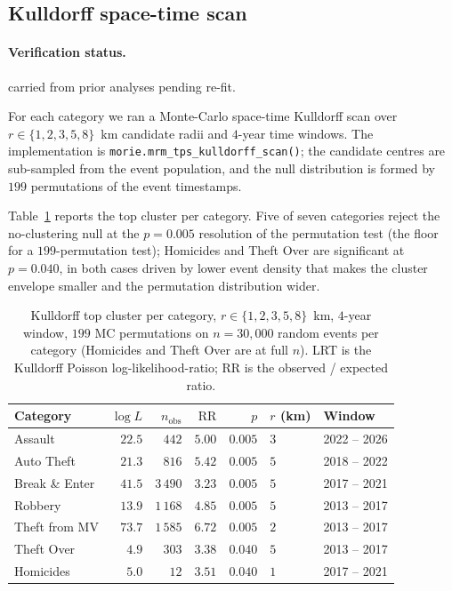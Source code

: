 \documentclass[article,shortnames,nojss]{jss}
\begin{document}
\subsection{Kulldorff space-time scan}\label{phys-kulldorff}


\paragraph*{Verification status.}
carried from prior analyses pending re-fit.

For each category we ran a Monte-Carlo space-time Kulldorff scan
\citep{kulldorff1997} over $r\in\{1,2,3,5,8\}$~km candidate radii and
$4$-year time windows.  The implementation is
\texttt{morie.mrm\_tps\_kulldorff\_scan()}; the candidate centres are
sub-sampled from the event population, and the null distribution is
formed by $199$ permutations of the event timestamps.

Table~\ref{tab:kulldorff-top} reports the top cluster per category.
Five of seven categories reject the no-clustering null at the
$p = 0.005$ resolution of the permutation test (the floor for a
$199$-permutation test); Homicides and Theft Over are
significant at $p = 0.040$, in both cases driven by lower event
density that makes the cluster envelope smaller and the
permutation distribution wider.

\begin{table}[h]
\centering\footnotesize
\caption{Kulldorff top cluster per category, $r\in\{1,2,3,5,8\}$~km,
$4$-year window, $199$ MC permutations on $n=30{,}000$ random events
per category (Homicides and Theft Over are at full $n$).  LRT is
the Kulldorff Poisson log-likelihood-ratio; RR is the observed /
expected ratio.}\label{tab:kulldorff-top}
\begin{tabular}{lrrrrll}
\toprule
Category & $\log\!L$ & $n_{\text{obs}}$ & $\text{RR}$ & $p$ &
$r$ (km) & Window\\\midrule
Assault          & $22.5$ & $\phantom{0}442$ & $5.00$ & $0.005$ & $3$ & 2022 -- 2026\\
Auto Theft       & $21.3$ & $\phantom{0}816$ & $5.42$ & $0.005$ & $5$ & 2018 -- 2022\\
Break \& Enter   & $41.5$ & $3\,490$ & $3.23$ & $0.005$ & $5$ & 2017 -- 2021\\
Robbery          & $13.9$ & $1\,168$ & $4.85$ & $0.005$ & $5$ & 2013 -- 2017\\
Theft from MV    & $73.7$ & $1\,585$ & $6.72$ & $0.005$ & $2$ & 2013 -- 2017\\
Theft Over       & $\phantom{0}4.9$ & $\phantom{0}303$ & $3.38$ & $0.040$ & $5$ & 2013 -- 2017\\
Homicides        & $\phantom{0}5.0$ & $\phantom{00}12$ & $3.51$ & $0.040$ & $1$ & 2017 -- 2021\\
\bottomrule
\end{tabular}
\end{table}
\end{document}

